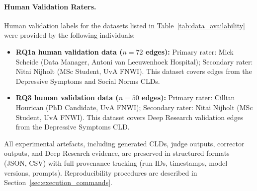 \paragraph{Human Validation Raters.} Human validation labels for the datasets listed in Table~\ref{tab:data_availability} were provided by the following individuals:
\begin{itemize}[noitemsep]
    \item \textbf{RQ1a human validation data ($n=72$ edges):} Primary rater: Mick Scheide (Data Manager, Antoni van Leeuwenhoek Hospital); Secondary rater: Nitai Nijholt (MSc Student, UvA FNWI). This dataset covers edges from the Depressive Symptoms and Social Norms CLDs.
    \item \textbf{RQ3 human validation data ($n=50$ edges):} Primary rater: Cillian Hourican (PhD Candidate, UvA FNWI); Secondary rater: Nitai Nijholt (MSc Student, UvA FNWI). This dataset covers Deep Research validation edges from the Depressive Symptoms CLD.
\end{itemize}

All experimental artefacts, including generated CLDs, judge outputs, corrector outputs, and Deep Research evidence, are preserved in structured formats (JSON, CSV) with full provenance tracking (run IDs, timestamps, model versions, prompts). Reproducibility procedures are described in Section~\ref{sec:execution_commands}.
